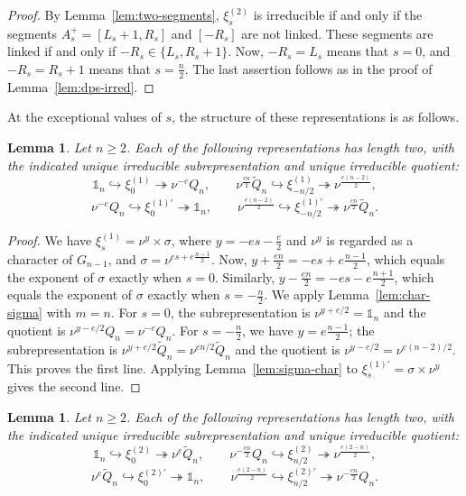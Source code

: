 \documentclass[11pt]{amsart}
\numberwithin{equation}{section}
\theoremstyle{plain}
\newtheorem{lemma}[theorem]{Lemma}
\theoremstyle{definition}
\theoremstyle{remark}
\newcommand{\one}{\mathds{1}}
\newcommand{\Qt}{\widetilde{Q}}
\newcommand{\xione}{\xi^{(1)}}
\newcommand{\xitwo}{\xi^{(2)}}
\begin{document}
\begin{proof}
	By Lemma~\ref{lem:two-segments}, $\xitwo_s$ is irreducible if and only if the segments $A_s^+=[L_s+1,R_s]$ and $[-R_s]$ are not linked. These segments are linked if and only if $-R_s\in\{L_s,R_s+1\}$. Now, $-R_s=L_s$ means that $s=0$, and $-R_s=R_s+1$ means that $s=\frac n2$. The last assertion follows as in the proof of Lemma~\ref{lem:dps-irred}.
\end{proof}

At the exceptional values of $s$, the structure of these representations is as follows.

\begin{lemma}\label{lem:dps1-exceptional}
	Let $n\ge2$. Each of the following representations has length two, with the indicated unique irreducible subrepresentation and unique irreducible quotient:
	$$
	\one_n\hookrightarrow\xione_0\twoheadrightarrow\nu^{-e}Q_n,\qquad
	\nu^{\frac{en}2}\Qt_n\hookrightarrow\xione_{-n/2}\twoheadrightarrow\nu^{\frac{e(n-2)}2},
	$$
	$$
	\nu^{-e}Q_n\hookrightarrow\xi^{(1)\prime}_0\twoheadrightarrow\one_n,\qquad
	\nu^{\frac{e(n-2)}2}\hookrightarrow\xi^{(1)\prime}_{-n/2}\twoheadrightarrow\nu^{\frac{en}2}\Qt_n.
	$$
\end{lemma}

\begin{proof}
	We have $\xione_s=\nu^y\times\sigma$, where $y=-es-\frac e2$ and $\nu^y$ is regarded as a character of $G_{n-1}$, and $\sigma=\nu^{es+e\frac{n-1}2}$. Now, $y+\frac{en}2=-es+e\frac{n-1}2$, which equals the exponent of $\sigma$ exactly when $s=0$. Similarly, $y-\frac{en}2=-es-e\frac{n+1}2$, which equals the exponent of $\sigma$ exactly when $s=-\frac n2$. We apply Lemma~\ref{lem:char-sigma} with $m=n$. For $s=0$, the subrepresentation is $\nu^{y+e/2}=\one_n$ and the quotient is $\nu^{y-e/2}Q_n=\nu^{-e}Q_n$. For $s=-\frac n2$, we have $y=e\frac{n-1}2$; the subrepresentation is $\nu^{y+e/2}\Qt_n=\nu^{en/2}\Qt_n$ and the quotient is $\nu^{y-e/2}=\nu^{e(n-2)/2}$. This proves the first line. Applying Lemma~\ref{lem:sigma-char} to $\xi^{(1)\prime}_s=\sigma\times\nu^y$ gives the second line.
\end{proof}

\begin{lemma}\label{lem:dps2-exceptional}
	Let $n\ge2$. Each of the following representations has length two, with the indicated unique irreducible subrepresentation and unique irreducible quotient:
	$$
	\one_n\hookrightarrow\xitwo_0\twoheadrightarrow\nu^{e}\Qt_n,\qquad
	\nu^{-\frac{en}2}Q_n\hookrightarrow\xitwo_{n/2}\twoheadrightarrow\nu^{\frac{e(2-n)}2},
	$$
	$$
	\nu^{e}\Qt_n\hookrightarrow\xi^{(2)\prime}_0\twoheadrightarrow\one_n,\qquad
	\nu^{\frac{e(2-n)}2}\hookrightarrow\xi^{(2)\prime}_{n/2}\twoheadrightarrow\nu^{-\frac{en}2}Q_n.
	$$
\end{lemma}
\end{document}
